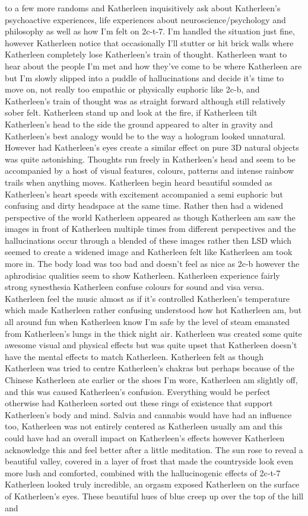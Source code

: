 \documentclass[12pt]{book}
\begin{document}
to a few more randoms and Katherleen inquisitively ask about Katherleen's psychoactive experiences, life experiences about neuroscience/psychology and philosophy as well as how I'm felt on 2c-t-7. I'm handled the situation just fine, however Katherleen notice that occasionally I'll stutter or hit brick walls where Katherleen completely lose Katherleen's train of thought. Katherleen want to hear about the people I'm met and how they've come to be where Katherleen are but I'm slowly slipped into a puddle of hallucinations and decide it's time to move on, not really too empathic or physically euphoric like 2c-b, and Katherleen's train of thought was as straight forward although still relatively sober felt. Katherleen stand up and look at the fire, if Katherleen tilt Katherleen's head to the side the ground appeared to alter in gravity and Katherleen's best analogy would be to the way a hologram looked unnatural. However had Katherleen's eyes create a similar effect on pure 3D natural objects was quite astonishing. Thoughts run freely in Katherleen's head and seem to be accompanied by a host of visual features, colours, patterns and intense rainbow trails when anything moves. Katherleen begin heard beautiful sounded as Katherleen's heart speeds with excitement accompanied a semi euphoric but confusing and dirty headspace at the same time. Rather then had a widened perspective of the world Katherleen appeared as though Katherleen am saw the images in front of Katherleen multiple times from different perspectives and the hallucinations occur through a blended of these images rather then LSD which seemed to create a widened image and Katherleen felt like Katherleen am took more in. The body load was too bad and doesn't feel as nice as 2c-b however the aphrodisiac qualities seem to show Katherleen. Katherleen experience fairly strong synesthesia Katherleen confuse colours for sound and visa versa. Katherleen feel the music almost as if it's controlled Katherleen's temperature which made Katherleen rather confusing understood how hot Katherleen am, but all around fun when Katherleen know I'm safe by the level of steam emanated from Katherleen's lungs in the thick night air. Katherleen was created some quite awesome visual and physical effects but was quite upset that Katherleen doesn't have the mental effects to match Katherleen. Katherleen felt as though Katherleen was tried to centre Katherleen's chakras but perhaps because of the Chinese Katherleen ate earlier or the shoes I'm wore, Katherleen am slightly off, and this was caused Katherleen's confusion. Everything would be perfect otherwise had Katherleen sorted out these rings of existence that support Katherleen's body and mind. Salvia and cannabis would have had an influence too, Katherleen was not entirely centered as Katherleen usually am and this could have had an overall impact on Katherleen's effects however Katherleen acknowledge this and feel better after a little meditation. The sun rose to reveal a beautiful valley, covered in a layer of frost that made the countryside look even more lush and comforted, combined with the hallucinogenic effects of 2c-t-7 Katherleen looked truly incredible, an orgasm exposed Katherleen on the surface of Katherleen's eyes. These beautiful hues of blue creep up over the top of the hill and 
\end{document}
